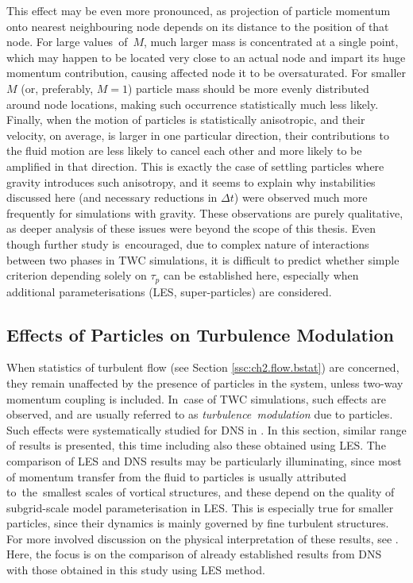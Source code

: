 \documentclass{pracamgren}
\begin{document}
This effect may be even more pronounced, as projection of particle momentum onto nearest neighbouring node depends on its distance to the position of that node.
For large values~of~$M$, much larger mass is concentrated at a single point, which may happen to be located very close to an actual node and impart its huge momentum contribution, causing affected node it to be oversaturated.
For smaller $M$ (or, preferably, $M=1$) particle mass should be more evenly distributed around node locations, making such occurrence statistically much less likely.
Finally, when the motion of particles is statistically anisotropic, and their velocity, on average, is larger in one particular direction, their contributions to the fluid motion are less likely to cancel each other and more likely to be amplified in that direction.
This is exactly the case of settling particles where gravity introduces such anisotropy, and it seems to explain why instabilities discussed here (and necessary reductions in $\Delta t$) were observed much more frequently for simulations with gravity.
These observations are purely qualitative, as deeper analysis of these issues were beyond the scope of this thesis.
Even though further study is~encouraged, due to complex nature of interactions between two phases in TWC simulations, it is difficult to predict whether simple criterion depending solely on $\tau_p$ can be established here, especially when additional parameterisations (LES, super-particles) are considered.



\subsection{Effects of Particles on Turbulence Modulation}
\label{ssc:ch2.flow.twc}

When statistics of turbulent flow (see Section \ref{ssc:ch2.flow.bstat}) are concerned, they remain unaffected by the presence of particles in the system, unless two-way momentum coupling is included.
In~case of TWC simulations, such effects are observed, and are usually referred to as \emph{turbulence~modulation} due to particles.
Such effects were systematically studied for DNS in \textcite{Rosa2020}.
In this section, similar range of results is presented, this time including also these obtained using LES.
The comparison of LES and DNS results may be particularly illuminating, since most of momentum transfer from the fluid to particles is usually attributed to~the~smallest scales of vortical structures, and these depend on the quality of subgrid-scale model parameterisation in LES.
This is especially true for smaller particles, since their dynamics is mainly governed by fine turbulent structures. 
For more involved discussion on the physical interpretation of these results, see \textcite{Rosa2020}.
Here, the focus is on the comparison of already established results from DNS with those obtained in this study using LES method.
\end{document}
